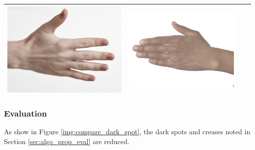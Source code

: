 \begin{longtable}{|c||c|c|c|}
\begin{minipage}{.29\textwidth}
    \includegraphics[width=\textwidth,height=\textheight,keepaspectratio]{../inputs/hand_pale.jpg}
  \end{minipage} & 
  \begin{minipage}{.29\textwidth}
    \includegraphics[width=\textwidth,height=\textheight,keepaspectratio]{../rc_test/outputs/20170517_proportional_corrected_test_alpha3/hand_brown_to_hand_pale.jpg}
  \end{minipage} \\
    \hline
\end{longtable}

\subsubsection*{Evaluation}
As show in Figure \ref{img:compare_dark_spot}, the dark spots and creases noted in Section \ref{sec:algo_prop_eval} are reduced.

